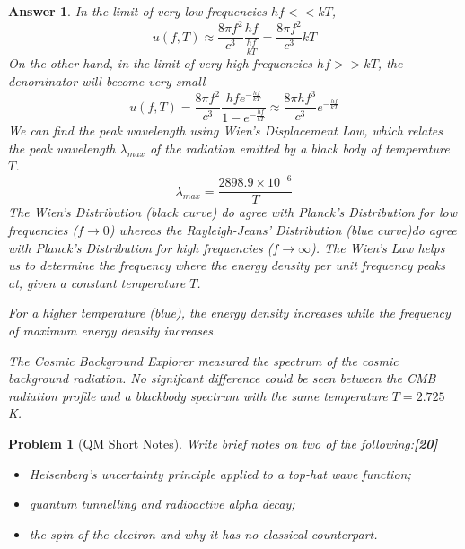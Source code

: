 \documentclass[a4paper]{article}
\newtheorem{ans}{Answer}[subsection]
\theoremstyle{new}
\newtheorem{qns}{Problem}[subsection]
\begin{document}
\begin{ans}
In the limit of very low frequencies $hf<<kT$, 
$$
u(f,T)\approx\frac{8\pi f^2}{c^3}\frac{hf}{\frac{hf}{kT}}=\frac{8\pi f^2}{c^3}kT
$$
On the other hand, in the limit of very high frequencies $hf>>kT$, the denominator will become very small
$$
u(f,T)=\frac{8\pi f^2}{c^3}\frac{hfe^{-\frac{hf}{kT}}}{1-e^{-\frac{hf}{kT}}}\approx\frac{8\pi hf^3}{c^3}e^{-\frac{hf}{kT}}$$
We can find the peak wavelength using Wien's Displacement Law, which relates the peak wavelength $\lambda_{max}$ of the radiation emitted by a black body of temperature $T$.
$$\lambda_{max}=\frac{2898.9\times 10^{-6}}{T}$$
The Wien's Distribution (black curve) do agree with Planck's Distribution for low frequencies ($f\rightarrow 0$) whereas the Rayleigh-Jeans' Distribution (blue curve)do agree with Planck's Distribution for high frequencies ($f\rightarrow\infty$). The Wien's Law helps us to determine the frequency where the energy density per unit frequency peaks at, given a constant temperature $T$.
\begin{center}
\end{center}
For a higher temperature (blue), the energy density increases while the frequency of maximum energy density increases.
\begin{center}
\end{center}
The Cosmic Background Explorer measured the spectrum of the cosmic background radiation. No signifcant difference could be seen between the CMB radiation profile and a blackbody spectrum with the same temperature $T=2.725$ K.
\end{ans}
\newpage
\begin{qns}[QM Short Notes]
Write brief notes on two of the following:\hfill\textbf{[20]}
\begin{itemize}
    \item Heisenberg's uncertainty principle applied to a top-hat wave function;
    \item quantum tunnelling and radioactive alpha decay;
    \item the spin of the electron and why it has no classical counterpart.
\end{itemize}
\end{qns}
\end{document}
